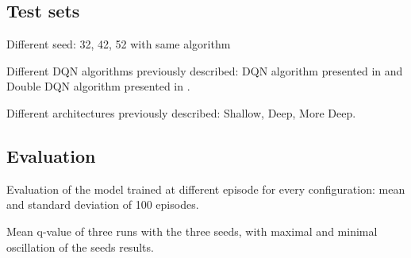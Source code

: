 
\subsection{Test sets}

Different seed: 32, 42, 52 with same algorithm

Different DQN algorithms previously described:
DQN algorithm presented in \cite{Mnih2015} and Double DQN algorithm presented in \cite{Hasselt:2016:DRL:3016100.3016191}.

Different architectures previously described: Shallow, Deep, More Deep.

\subsection{Evaluation}

Evaluation of the model trained at different episode for every configuration:
mean and standard deviation of 100 episodes.

Mean q-value of three runs with the three seeds, with maximal and minimal oscillation of the seeds results.



